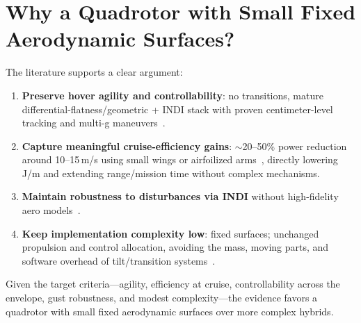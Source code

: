 \section{Why a Quadrotor with Small Fixed Aerodynamic Surfaces?}

The literature supports a clear argument:
\begin{enumerate}
  \item \textbf{Preserve hover agility and controllability}: no transitions, mature differential-flatness/geometric + INDI stack with proven centimeter-level tracking and multi-g maneuvers~\cite{Lee2010,Tal2018,Foehn2022}.
  \item \textbf{Capture meaningful cruise-efficiency gains}: $\sim$20--50\% power reduction around 10--15\,m/s using small wings or airfoilized arms~\cite{Dawkins2018,Xiao2020,Freitas2025}, directly lowering J/m and extending range/mission time without complex mechanisms.
  \item \textbf{Maintain robustness to disturbances via INDI} without high-fidelity aero models~\cite{Sieberling2010,Smeur2017,Sun2021}.
  \item \textbf{Keep implementation complexity low}: fixed surfaces; unchanged propulsion and control allocation, avoiding the mass, moving parts, and software overhead of tilt/transition systems~\cite{Misra2022,Okulski2022}.
\end{enumerate}
Given the target criteria---agility, efficiency at cruise, controllability across the envelope, gust robustness, and modest complexity---the evidence favors a quadrotor with small fixed aerodynamic surfaces over more complex hybrids.
